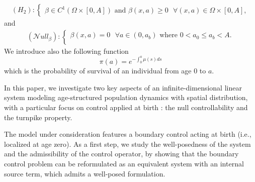 \documentclass[10pt, a4]{amsart}
\theoremstyle{plain}
\theoremstyle{definition}
\theoremstyle{remark}
\numberwithin{equation}{section}
\newcommand{\cN}{\mathcal{N}}
\begin{document}
\begin{align*}
(H_2):\left\lbrace\begin{array}{l}
	\beta\in C^{1}(\Omega\times[0,A]) \text{ and }\beta(x,a)\geq 0\text{ }\forall (x,a)\in \Omega\times[0,A],
\end{array}
\right.
\end{align*}
and 
\begin{align*}
(\cN ull_{\beta}):\left\lbrace\begin{array}{l}
	\beta(x,a)=0 \text{ } \forall a\in (0,a_b) \text{ where } 0<a_0\leq a_b<A. \\
\end{array}
\right.
\end{align*}
We introduce also the following function 
\begin{equation*}
    \pi(a)=e^{-\displaystyle\int_0^a\mu(s)ds}
\end{equation*}
which is the probability of survival of an individual from age $0$ to $a.$  


In this paper, we investigate two key aspects of an infinite-dimensional linear system modeling age-structured population dynamics with spatial distribution, with a particular focus on control applied at birth : the null controllability and the turnpike property.  

 The model under consideration features a boundary control acting at birth (i.e., localized at age zero). As a first step, we study the well-posedness of the system and the admissibility of the control operator, by showing that the boundary control problem can be reformulated as an equivalent system with an internal source term, which admits a well-posed formulation.  
\end{document}
